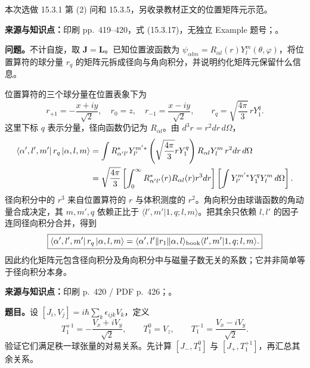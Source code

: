 本次选做 15.3.1 第 (2) 问和 15.3.5，另收录教材正文的位置矩阵元示范。

\textbf{来源与知识点：}印刷 pp.~419--420，式 (15.3.17)，无独立 Example 题号；。

\textbf{问题。}不计自旋，取 $\mathbf J=\mathbf L$。已知位置波函数为 $\psi_{\alpha lm}=R_{\alpha l}(r)Y_l^m(\theta,\varphi)$，将位置算符的球分量 $r_q$ 的矩阵元拆成径向与角向积分，并说明约化矩阵元保留什么信息。

\begin{checkedsolution}
位置算符的三个球分量在位置表象下为
\begin{equation}
  r_{+1}=-\frac{x+iy}{\sqrt2},\quad r_0=z,\quad
  r_{-1}=\frac{x-iy}{\sqrt2},\qquad
  r_q=\sqrt{\frac{4\pi}{3}}\,rY_1^q.
\end{equation}
这里下标 $q$ 表示分量，径向函数仍记为 $R_{\alpha l}$。由 $d^3r=r^2dr\,d\Omega$，
\begin{align}
  \left\langle \alpha',l',m'\right|r_q\left|\alpha,l,m\right\rangle
    &=\int R_{\alpha'l'}^*Y_{l'}^{m'*}
        \left(\sqrt{\frac{4\pi}{3}}rY_1^q\right)
        R_{\alpha l}Y_l^m\,r^2dr\,d\Omega\\
    &=\sqrt{\frac{4\pi}{3}}
       \left[\int_0^\infty R_{\alpha'l'}^*(r)R_{\alpha l}(r)r^3dr\right]
       \left[\int Y_{l'}^{m'*}Y_1^qY_l^m\,d\Omega\right].
\end{align}
径向积分中的 $r^3$ 来自位置算符的 $r$ 与体积测度的 $r^2$。角向积分由球谐函数的角动量合成决定，其 $m,m',q$ 依赖正比于 $\langle l',m'|1,q;l,m\rangle$。把其余只依赖 $l,l'$ 的因子连同径向积分合并，得到
\begin{equation}
  \boxed{\left\langle \alpha',l',m'\right|r_q\left|\alpha,l,m\right\rangle
    =\langle\alpha',l'\|r_1\|\alpha,l\rangle_{\rm book}
      \langle l',m'|1,q;l,m\rangle.}
\end{equation}
因此约化矩阵元包含径向积分及角向积分中与磁量子数无关的系数；它并非简单等于径向积分本身。
\end{checkedsolution}

\textbf{来源与知识点：}印刷 p.~420 / PDF p.~426；。

\textbf{题目。}设 $[J_i,V_j]=i\hbar\sum_k\epsilon_{ijk}V_k$，定义
\begin{equation}
  T_1^{+1}=-\frac{V_x+iV_y}{\sqrt2},\qquad
  T_1^0=V_z,\qquad T_1^{-1}=\frac{V_x-iV_y}{\sqrt2}.
\end{equation}
验证它们满足秩一球张量的对易关系。先计算 $[J_-,T_1^0]$ 与 $[J_+,T_1^{+1}]$，再汇总其余关系。

